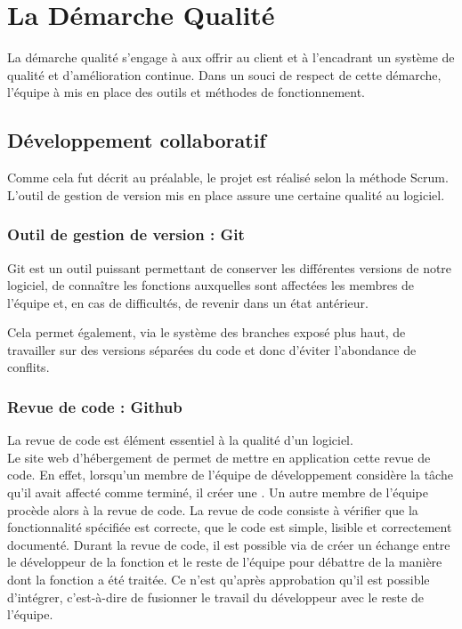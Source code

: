 \chapter{La Démarche Qualité}
La démarche qualité s'engage à aux offrir au client et à l'encadrant un système de qualité et d'amélioration continue. 
Dans un souci de respect de cette démarche, l'équipe à mis en place des outils et méthodes de fonctionnement. 
\section{Développement collaboratif}
Comme cela fut décrit au préalable, le projet est réalisé selon la méthode Scrum. L'outil de gestion de version  mis en place assure une certaine qualité au logiciel.
\subsection{Outil de gestion de version : Git}
Git est un outil puissant permettant de conserver les différentes versions de notre logiciel, de connaître les fonctions auxquelles sont affectées les membres de l'équipe et, en cas de difficultés, de revenir dans un état antérieur. 

Cela permet également, via le système des branches exposé plus haut, de travailler sur des versions séparées du code et donc d'éviter l'abondance de conflits.
\subsection{Revue de code : Github}
La revue de code est élément essentiel à la qualité d'un logiciel. \\
Le site web d'hébergement  de  permet de mettre en application cette revue de code. En effet, lorsqu'un membre de l'équipe de développement considère la tâche qu'il avait affecté comme terminé, il créer une . Un autre membre de l'équipe procède alors à la revue de code. La revue de code consiste à vérifier que la fonctionnalité spécifiée est correcte, que le code est simple, lisible et correctement documenté. Durant la revue de code, il est possible via  de créer un échange entre le développeur de la fonction et le reste de l'équipe pour débattre de la manière dont la fonction a été traitée. Ce n'est qu'après approbation qu'il est possible d'intégrer, c'est-à-dire de fusionner le travail du développeur avec le reste de l'équipe. 
